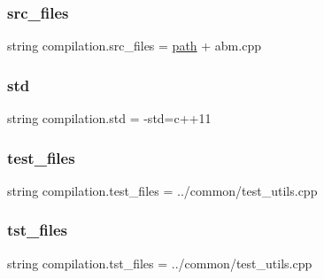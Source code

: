 \subsubsection{\texorpdfstring{src\+\_\+files}{src\_files}}
{\footnotesize\ttfamily string compilation.\+src\+\_\+files = \hyperlink{namespacecompilation_a3e72f84f29fb2f8b2a01891b25334512}{path} + \textquotesingle{}abm.\+cpp\textquotesingle{}}

\mbox{\label{namespacecompilation_a762bca1fba31c18bcb62094e66cd2aa2}} 
\subsubsection{\texorpdfstring{std}{std}}
{\footnotesize\ttfamily string compilation.\+std = \textquotesingle{}-\/std=c++11\textquotesingle{}}

\mbox{\label{namespacecompilation_af5b96eb6fff973f2670825ebd43d0f99}} 
\subsubsection{\texorpdfstring{test\+\_\+files}{test\_files}}
{\footnotesize\ttfamily string compilation.\+test\+\_\+files = \textquotesingle{}../common/test\+\_\+utils.\+cpp\textquotesingle{}}

\mbox{\label{namespacecompilation_afc391618d31035167addaa7c490b4b83}} 
\subsubsection{\texorpdfstring{tst\+\_\+files}{tst\_files}}
{\footnotesize\ttfamily string compilation.\+tst\+\_\+files = \textquotesingle{}../common/test\+\_\+utils.\+cpp\textquotesingle{}}

